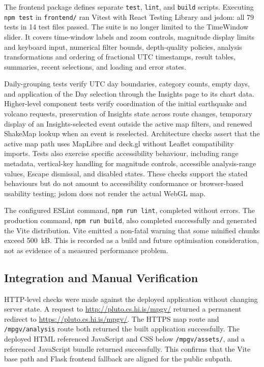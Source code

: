 \documentclass[12pt]{article}
\begin{document}
The frontend package defines separate \texttt{test}, \texttt{lint}, and \texttt{build} scripts. Executing \texttt{npm test} in \texttt{frontend/} ran Vitest with React Testing Library and jsdom: all 79 tests in 14 test files passed. The suite is no longer limited to the TimeWindow slider. It covers time-window labels and zoom controls, magnitude display limits and keyboard input, numerical filter bounds, depth-quality policies, analysis transformations and ordering of fractional UTC timestamps, result tables, summaries, recent selections, and loading and error states.

Daily-grouping tests verify UTC day boundaries, category counts, empty days, and application of the Day selection through the Insights page to its chart data. Higher-level component tests verify coordination of the initial earthquake and volcano requests, preservation of Insights state across route changes, temporary display of an Insights-selected event outside the active map filters, and renewed ShakeMap lookup when an event is reselected. Architecture checks assert that the active map path uses MapLibre and deck.gl without Leaflet compatibility imports. Tests also exercise specific accessibility behaviour, including range metadata, vertical-key handling for magnitude controls, accessible analysis-range values, Escape dismissal, and disabled states. These checks support the stated behaviours but do not amount to accessibility conformance or browser-based usability testing; jsdom does not render the actual WebGL map.

The configured ESLint command, \texttt{npm run lint}, completed without errors. The production command, \texttt{npm run build}, also completed successfully and generated the Vite distribution. Vite emitted a non-fatal warning that some minified chunks exceed 500~kB. This is recorded as a build and future optimisation consideration, not as evidence of a measured performance problem.

\subsection{Integration and Manual Verification}

HTTP-level checks were made against the deployed application without changing server state. A request to \url{http://pluto.cs.hi.is/mpgv/} returned a permanent redirect to \url{https://pluto.cs.hi.is/mpgv/}. The HTTPS map route and \texttt{/mpgv/analysis} route both returned the built application successfully. The deployed HTML referenced JavaScript and CSS below \texttt{/mpgv/assets/}, and a referenced JavaScript bundle returned successfully. This confirms that the Vite base path and Flask frontend fallback are aligned for the public subpath.
\end{document}
